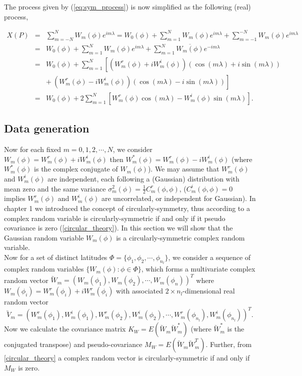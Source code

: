 	The process given by (\ref{eq:sym_process}) is now simplified as the following (real) process,
		
	\begin{eqnarray} \label{eq:finite_process}
		X(P) &=& \sum_{m = -N}^N W_m(\phi) e^{im \lambda} =  W_0(\phi) + \sum_{m =1}^N W_m(\phi) e^{im \lambda} + \sum_{m =-1}^{-N} W_m(\phi) e^{im \lambda} \nonumber \\
		&=& W_0(\phi) + \sum_{m =1}^N W_m(\phi) e^{im \lambda} + \sum_{m =1}^{N} \overline{W_m(\phi)} e^{-im \lambda} \nonumber \\
		&=& W_0(\phi) + \sum_{m =1}^N \left[  (W_m^r(\phi)+iW_m^i(\phi))(\cos(m \lambda) + i \sin(m \lambda)) \right. \nonumber \\
		& & \left. +\ (W_m^r(\phi)-iW_m^i(\phi))(\cos(m \lambda) - i \sin(m \lambda))  \right]  \nonumber \\
		&=& W_0(\phi) + 2 \sum_{m =1}^N \left[W_m^r(\phi)\cos(m\lambda) - W_m^i(\phi)\sin(m \lambda)\right].
	\end{eqnarray}
		
		
		
	\subsection{Data generation}
		
	Now for each fixed $m = 0, 1, 2, \cdots, N$, we consider  $W_m(\phi) = W_m^r(\phi) + i W_m^i(\phi)$ then $W_m^*(\phi) = W_m^r(\phi) - i W_m^i(\phi)$ (where $W_m^*(\phi)$ is the complex conjugate of $W_m(\phi)$). We may assume that $W_m^r(\phi)$ and $W_m^i(\phi)$ are independent, each following a (Gaussian) distribution with mean zero and the same variance $\sigma_m^2(\phi) = \frac{1}{2}C_m^r(\phi, \phi)$, ($C_m^i(\phi, \phi) = 0$ implies $W_m^r(\phi)$ and $W_m^i(\phi)$ are uncorrelated, or independent for Gaussian). In chapter 1 we introduced the concept of circularly-symmetry, thus according to \cite{Gallager2008} a complex random variable is circularly-symmetric if and only if it pseudo covariance is zero (\ref{circular_theory}). In this section we will show that the Gaussian random variable $W_m(\phi)$ is a circularly-symmetric complex random variable.  \\
		
	Now for a set of distinct latitudes $\Phi = \{\phi_1, \phi_2, \cdots, \phi_{n_l}\}$, we consider a sequence of complex random variables $\{W_m(\phi): \phi \in \Phi\}$, which forms a multivariate complex random vector $\utilde{W}_m = (W_m(\phi_1), W_m(\phi_2), \cdots, W_m(\phi_n))^T$ where $W_m(\phi_i) = W_m^r(\phi_i) + iW_m^r(\phi_i)$ with associated $2\times n_l$-dimensional real random vector
	$$\utilde{V}_m = (W_m^r(\phi_1), W_m^i(\phi_1),W_m^r(\phi_2), W_m^i(\phi_2),\cdots, W_m^r(\phi_{n_l}), W_m^i(\phi_{n_l}))^T.$$
	Now we calculate the covariance matrix $K_W = E(\utilde{W}_m\utilde{W}_m^*)$ (where $\utilde{W}_m^*$ is the conjugated transpose) and pseudo-covariance $M_W = E(\utilde{W}_m\utilde{W}_m^T)$. Further, from \ref{circular_theory} a complex random vector is circularly-symmetric if and only if $M_W$ is zero.
		
